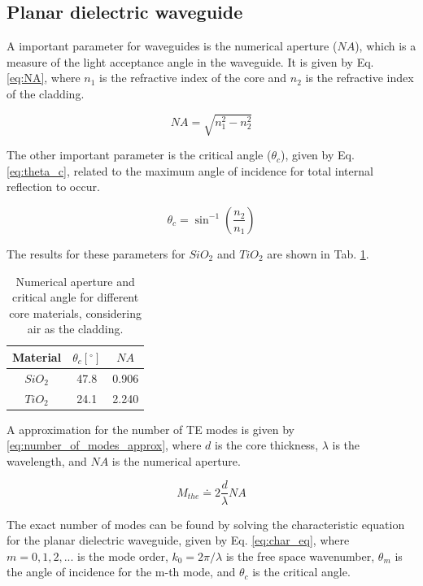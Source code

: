 \documentclass[a4paper,12pt]{article}
\begin{document}
\subsection{Planar dielectric waveguide}
\label{subsec:planar_dielectric_waveguide}

A important parameter for waveguides is the numerical aperture ($NA$), which is a measure of the light acceptance angle in the waveguide. It is given by Eq. \ref{eq:NA}, where $n_1$ is the refractive index of the core and $n_2$ is the refractive index of the cladding. 

\begin{equation}
    NA = \sqrt{n_1^2 - n_2^2} 
    \label{eq:NA}
\end{equation}

The other important parameter is the critical angle ($\theta_c$), given by Eq. \ref{eq:theta_c}, related to the maximum angle of incidence for total internal reflection to occur.

\begin{equation}
    \theta_c = \sin^{-1} \left(\frac{n_2}{n_1}\right) 
    \label{eq:theta_c}
\end{equation}

The results for these parameters for $SiO_2$ and $TiO_2$ are shown in Tab. \ref{tab:na_theta_c}.

\begin{table}[H]
    \centering
    \begin{tabular}{ccc}
        \toprule
        Material & $\theta_c [^\circ]$ & $NA$ \\
        \midrule
        $SiO_2$ & 47.8 & 0.906 \\
        $TiO_2$ & 24.1 & 2.240 \\
        \bottomrule
    \end{tabular}
    \caption{Numerical aperture and critical angle for different core materials, considering air as the cladding.}
    \label{tab:na_theta_c}
\end{table}

A approximation for the number of TE modes is given by \eqref{eq:number_of_modes_approx}, where $d$ is the core thickness, $\lambda$ is the wavelength, and $NA$ is the numerical aperture. 

\begin{equation}
    M_{the} \doteq 2 \frac{d}{\lambda} NA
    \label{eq:number_of_modes_approx}
\end{equation}

The exact number of modes can be found by solving the characteristic equation for the planar dielectric waveguide, given by Eq. \ref{eq:char_eq}, where $m = 0, 1, 2, ...$ is the mode order, $k_0 = 2 \pi / \lambda$ is the free space wavenumber, $\theta_m$ is the angle of incidence for the m-th mode, and $\theta_c$ is the critical angle.
\end{document}
